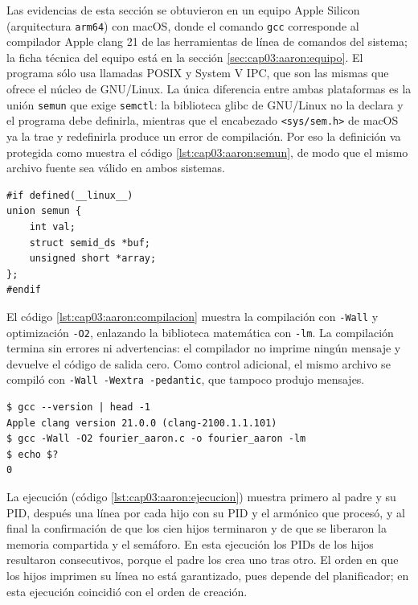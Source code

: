 Las evidencias de esta sección se obtuvieron en un equipo Apple Silicon (arquitectura \texttt{arm64}) con macOS, donde el comando \texttt{gcc} corresponde al compilador Apple clang 21 de las herramientas de línea de comandos del sistema; la ficha técnica del equipo está en la sección \ref{sec:cap03:aaron:equipo}. El programa sólo usa llamadas POSIX y System V IPC, que son las mismas que ofrece el núcleo de GNU/Linux. La única diferencia entre ambas plataformas es la unión \texttt{semun} que exige \texttt{semctl}: la biblioteca glibc de GNU/Linux no la declara y el programa debe definirla, mientras que el encabezado \texttt{<sys/sem.h>} de macOS ya la trae y redefinirla produce un error de compilación. Por eso la definición va protegida como muestra el código \ref{lst:cap03:aaron:semun}, de modo que el mismo archivo fuente sea válido en ambos sistemas.

\begin{lstlisting}[style=C, caption={Definición de \texttt{union semun} sólo en GNU/Linux.}, label={lst:cap03:aaron:semun}]
#if defined(__linux__)
union semun {
    int val;
    struct semid_ds *buf;
    unsigned short *array;
};
#endif
\end{lstlisting}

El código \ref{lst:cap03:aaron:compilacion} muestra la compilación con \texttt{-Wall} y optimización \texttt{-O2}, enlazando la biblioteca matemática con \texttt{-lm}. La compilación termina sin errores ni advertencias: el compilador no imprime ningún mensaje y devuelve el código de salida cero. Como control adicional, el mismo archivo se compiló con \texttt{-Wall -Wextra -pedantic}, que tampoco produjo mensajes.

\begin{lstlisting}[numbers=none, language={}, caption={Compilación del programa sin errores ni advertencias.}, label={lst:cap03:aaron:compilacion}]
$ gcc --version | head -1
Apple clang version 21.0.0 (clang-2100.1.1.101)
$ gcc -Wall -O2 fourier_aaron.c -o fourier_aaron -lm
$ echo $?
0
\end{lstlisting}

La ejecución (código \ref{lst:cap03:aaron:ejecucion}) muestra primero al padre y su PID, después una línea por cada hijo con su PID y el armónico que procesó, y al final la confirmación de que los cien hijos terminaron y de que se liberaron la memoria compartida y el semáforo. En esta ejecución los PIDs de los hijos resultaron consecutivos, porque el padre los crea uno tras otro. El orden en que los hijos imprimen su línea no está garantizado, pues depende del planificador; en esta ejecución coincidió con el orden de creación.

